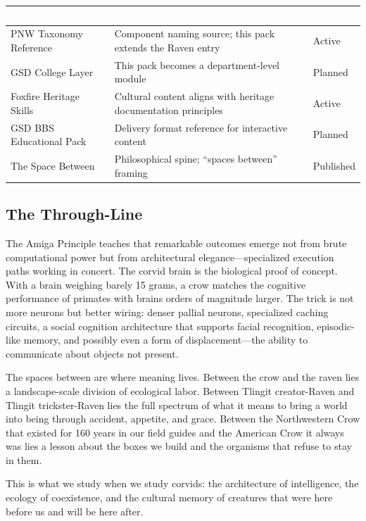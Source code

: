 \documentclass[11pt,letterpaper]{article}
\newcommand{\tableheader}[1]{\textbf{\sffamily\textcolor{white}{#1}}}
\begin{document}
\begin{center}
\begin{tabularx}{\textwidth}{L{4cm}XC{2.5cm}}
\toprule
{}
\tableheader{Document} & \tableheader{Relationship} & \tableheader{Status} \\
\midrule
PNW Taxonomy Reference & Component naming source; this pack extends the Raven entry & Active \\
GSD College Layer & This pack becomes a department-level module & Planned \\
Foxfire Heritage Skills & Cultural content aligns with heritage documentation principles & Active \\
GSD BBS Educational Pack & Delivery format reference for interactive content & Planned \\
The Space Between & Philosophical spine; ``spaces between'' framing & Published \\
\bottomrule
\end{tabularx}
\end{center}

\subsection{The Through-Line}

The Amiga Principle teaches that remarkable outcomes emerge not from brute computational power but from architectural elegance---specialized execution paths working in concert. The corvid brain is the biological proof of concept. With a brain weighing barely 15 grams, a crow matches the cognitive performance of primates with brains orders of magnitude larger. The trick is not more neurons but better wiring: denser pallial neurons, specialized caching circuits, a social cognition architecture that supports facial recognition, episodic-like memory, and possibly even a form of displacement---the ability to communicate about objects not present.

The spaces between are where meaning lives. Between the crow and the raven lies a landscape-scale division of ecological labor. Between Tlingit creator-Raven and Tlingit trickster-Raven lies the full spectrum of what it means to bring a world into being through accident, appetite, and grace. Between the Northwestern Crow that existed for 160 years in our field guides and the American Crow it always was lies a lesson about the boxes we build and the organisms that refuse to stay in them.

This is what we study when we study corvids: the architecture of intelligence, the ecology of coexistence, and the cultural memory of creatures that were here before us and will be here after.
\end{document}
